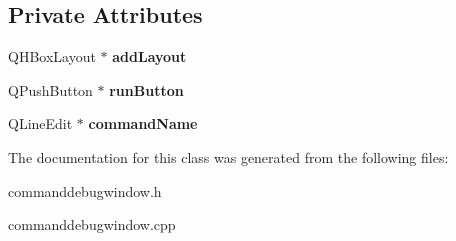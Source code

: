 \subsection*{Private Attributes}
\begin{DoxyCompactItemize}
\item 
\hypertarget{class_command_debug_window_a22110f0e3480da7ad1bff37e0824f4ca}{}Q\+H\+Box\+Layout $\ast$ {\bfseries add\+Layout}\label{class_command_debug_window_a22110f0e3480da7ad1bff37e0824f4ca}

\item 
\hypertarget{class_command_debug_window_a9f81804d9eafb39b9d68250e57da70d0}{}Q\+Push\+Button $\ast$ {\bfseries run\+Button}\label{class_command_debug_window_a9f81804d9eafb39b9d68250e57da70d0}

\item 
\hypertarget{class_command_debug_window_aaadd088f471e15d60bbbbd50b522c1ee}{}Q\+Line\+Edit $\ast$ {\bfseries command\+Name}\label{class_command_debug_window_aaadd088f471e15d60bbbbd50b522c1ee}

\end{DoxyCompactItemize}


The documentation for this class was generated from the following files\+:\begin{DoxyCompactItemize}
\item 
commanddebugwindow.\+h\item 
commanddebugwindow.\+cpp\end{DoxyCompactItemize}
